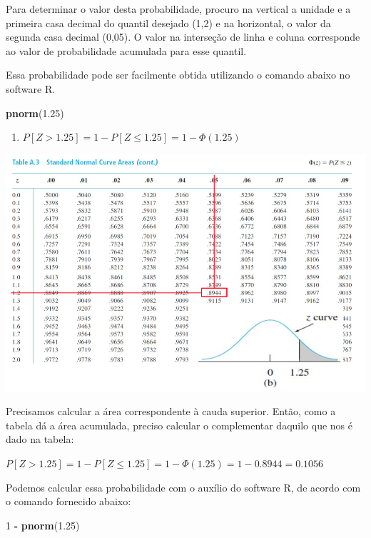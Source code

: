 \documentclass[
]{book}
\newenvironment{Shaded}{\begin{snugshade}}{\end{snugshade}}
\newcommand{\DecValTok}[1]{\textcolor[rgb]{0.00,0.00,0.81}{#1}}
\newcommand{\FloatTok}[1]{\textcolor[rgb]{0.00,0.00,0.81}{#1}}
\newcommand{\KeywordTok}[1]{\textcolor[rgb]{0.13,0.29,0.53}{\textbf{#1}}}
\newcommand{\NormalTok}[1]{#1}
\newcommand{\OperatorTok}[1]{\textcolor[rgb]{0.81,0.36,0.00}{\textbf{#1}}}
\newcommand{\StringTok}[1]{\textcolor[rgb]{0.31,0.60,0.02}{#1}}
\providecommand{\tightlist}{%
  \setlength{\itemsep}{0pt}\setlength{\parskip}{0pt}}
\theoremstyle{definition}
\theoremstyle{definition}
\theoremstyle{definition}
\theoremstyle{remark}
\begin{document}
Para determinar o valor desta probabilidade, procuro na vertical a unidade e a primeira casa decimal do quantil desejado (1,2) e na horizontal, o valor da segunda casa decimal (0,05). O valor na interseção de linha e coluna corresponde ao valor de probabilidade acumulada para esse quantil.

Essa probabilidade pode ser facilmente obtida utilizando o comando abaixo no software R.

\begin{Shaded}
\begin{Highlighting}[]
\KeywordTok{pnorm}\NormalTok{(}\FloatTok{1.25}\NormalTok{)}
\end{Highlighting}
\end{Shaded}

\begin{enumerate}
\def\labelenumi{(\alph{enumi})}
\setcounter{enumi}{1}
\tightlist
\item
  \(P[Z > 1.25] = 1- P[Z \leq 1.25] = 1 - \Phi(1.25)\)
\end{enumerate}

\includegraphics[width=1\linewidth]{img/distr-normal-b}

Precisamos calcular a área correspondente à cauda superior. Então, como a tabela dá a área acumulada, preciso calcular o complementar daquilo que nos é dado na tabela:

\(P[Z > 1.25] = 1 - P[Z ≤ 1.25] = 1 - \Phi(1.25) = 1 - 0.8944 = 0.1056\)

Podemos calcular essa probabilidade com o auxílio do software R, de acordo com o comando fornecido abaixo:

\begin{Shaded}
\begin{Highlighting}[]
\DecValTok{1} \OperatorTok{-}\StringTok{ }\KeywordTok{pnorm}\NormalTok{(}\FloatTok{1.25}\NormalTok{)}
\end{Highlighting}
\end{Shaded}
\end{document}

